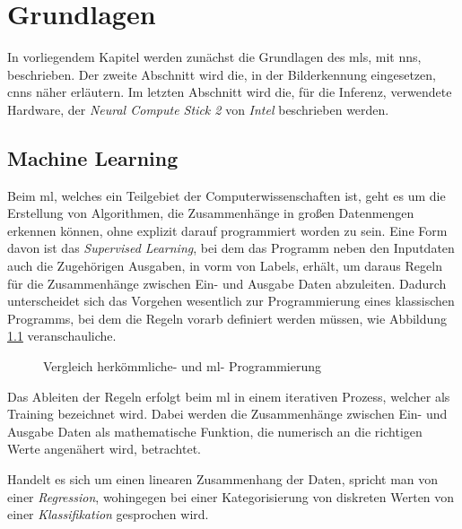 \chapter{Grundlagen}\label{kap:grundlagen}


In vorliegendem Kapitel werden zunächst die Grundlagen 
des \Glspl{ml}, mit \Glspl{nn}, 
beschrieben. Der zweite Abschnitt wird die, in der 
Bilderkennung eingesetzen, \Glspl{cnn} näher erläutern.
Im letzten Abschnitt wird die, für die Inferenz, 
verwendete Hardware, der \textit{Neural Compute Stick 2}
von \textit{Intel} beschrieben werden.



\section{Machine Learning}\label{sec:ml}

Beim \Gls{ml}, welches ein Teilgebiet der Computerwissenschaften
ist, geht es um die Erstellung von Algorithmen, die Zusammenhänge in 
großen Datenmengen erkennen können, ohne explizit darauf programmiert
worden zu sein.
Eine Form davon ist das \textit{Supervised Learning}, bei dem
das Programm neben den Inputdaten auch die Zugehörigen Ausgaben,
in vorm von Labels, erhält, um daraus 
Regeln für die Zusammenhänge zwischen Ein- und Ausgabe Daten
abzuleiten.
Dadurch unterscheidet sich das Vorgehen wesentlich zur Programmierung 
eines klassischen Programms, bei dem die Regeln vorarb definiert 
werden müssen, wie Abbildung \ref{fig:classic_vs_ml}
veranschauliche.
\vspace{0.5cm}

\begin{figure}[H]
    \centering
    
    \caption{Vergleich herkömmliche- und \Gls{ml}- Programmierung}
    \label{fig:classic_vs_ml}
\end{figure}
\vspace{0.5cm}

Das Ableiten der Regeln erfolgt beim \Gls{ml} in einem 
iterativen Prozess, welcher als Training bezeichnet wird.
Dabei werden die Zusammenhänge zwischen Ein- und Ausgabe Daten 
als mathematische Funktion, die numerisch an die richtigen Werte
angenähert wird, betrachtet.

Handelt es sich um einen linearen Zusammenhang der 
Daten, spricht man von einer \textit{Regression}, 
wohingegen bei einer Kategorisierung von diskreten 
Werten von einer \textit{Klassifikation} gesprochen wird.

